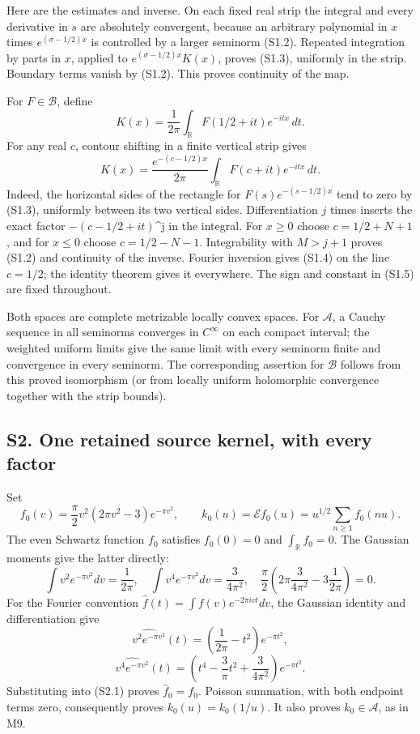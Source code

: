 \documentclass[
]{article}
\begin{document}
Here are the estimates and inverse. On each fixed real strip the
integral and every derivative in \(s\) are absolutely convergent,
because an arbitrary polynomial in \(x\) times \(e^{(\sigma-1/2)x}\) is
controlled by a larger seminorm (S1.2). Repeated integration by parts in
\(x\), applied to \(e^{(\sigma-1/2)x}K(x)\), proves (S1.3), uniformly in
the strip. Boundary terms vanish by (S1.2). This proves continuity of
the map.

For \(F\in\mathcal B\), define \[
K(x)=\frac1{2\pi}\int_{\mathbb R}F(1/2+it)e^{-itx}\,dt.
\tag{S1.5}
\] For any real \(c\), contour shifting in a finite vertical strip gives
\[
K(x)=\frac{e^{-(c-1/2)x}}{2\pi}
\int_{\mathbb R}F(c+it)e^{-itx}\,dt.
\tag{S1.6}
\] Indeed, the horizontal sides of the rectangle for
\(F(s)e^{-(s-1/2)x}\) tend to zero by (S1.3), uniformly between its two
vertical sides. Differentiation \(j\) times inserts the exact factor
\(-(c-1/2+it)\)\^{}j in the integral. For \(x\ge0\) choose
\(c=1/2+N+1\), and for \(x\le0\) choose \(c=1/2-N-1\). Integrability
with \(M>j+1\) proves (S1.2) and continuity of the inverse. Fourier
inversion gives (S1.4) on the line \(c=1/2\); the identity theorem gives
it everywhere. The sign and constant in (S1.5) are fixed throughout.

Both spaces are complete metrizable locally convex spaces. For
\(\mathcal A\), a Cauchy sequence in all seminorms converges in
\(C^\infty\) on each compact interval; the weighted uniform limits give
the same limit with every seminorm finite and convergence in every
seminorm. The corresponding assertion for \(\mathcal B\) follows from
this proved isomorphism (or from locally uniform holomorphic convergence
together with the strip bounds).

\subsection{S2. One retained source kernel, with every
factor}\label{s2.-one-retained-source-kernel-with-every-factor}

Set \[
f_0(v)=\frac\pi2v^2(2\pi v^2-3)e^{-\pi v^2},\qquad
k_0(u)=\mathcal E f_0(u)=u^{1/2}\sum_{n\ge1}f_0(nu).
\tag{S2.1}
\] The even Schwartz function \(f_0\) satisfies \(f_0(0)=0\) and
\(\int_{\mathbb R}f_0=0\). The Gaussian moments give the latter
directly: \[
\int v^2e^{-\pi v^2}dv=\frac1{2\pi},\quad
\int v^4e^{-\pi v^2}dv=\frac3{4\pi^2},\quad
\frac\pi2\left(2\pi\frac3{4\pi^2}-3\frac1{2\pi}\right)=0.
\] For the Fourier convention
\(\widehat f(t)=\int f(v)e^{-2\pi ivt}dv\), the Gaussian identity and
differentiation give \[
\widehat{v^2e^{-\pi v^2}}(t)=\left(\frac1{2\pi}-t^2\right)e^{-\pi t^2},
\] \[
\widehat{v^4e^{-\pi v^2}}(t)=
\left(t^4-\frac3\pi t^2+\frac3{4\pi^2}\right)e^{-\pi t^2}.
\] Substituting into (S2.1) proves \(\widehat f_0=f_0\). Poisson
summation, with both endpoint terms zero, consequently proves
\(k_0(u)=k_0(1/u)\). It also proves \(k_0\in\mathcal A\), as in M9.
\end{document}
